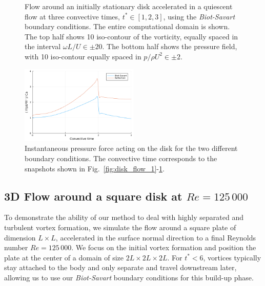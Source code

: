 \documentclass{article}
\begin{document}
\begin{figure}
\begin{subfigure}{.33\textwidth}
    \end{subfigure}
    \caption{Flow around an initially stationary disk accelerated in a quiescent flow at three convective times, $t^*\in [1,2,3]$, using the \emph{Biot-Savart} boundary conditions. The entire computational domain is shown. The top half shows 10 iso-contour of the vorticity, equally spaced in the interval $\omega L/U\in\pm20$. The bottom half shows the pressure field, with 10 iso-contour equally spaced in $p/\rho U^2\in\pm2$.}
    \label{fig:disk_flow_2}
\end{figure}


\begin{figure}
    \centering
    \includegraphics[width=0.5\textwidth]{tex//fig/Disk_256D_force.png}
    \caption{Instantaneous pressure force acting on the disk for the two different boundary conditions. The convective time corresponds to the snapshots shown in Fig.~\ref{fig:disk_flow_1}-\ref{fig:disk_flow_2}.}
    \label{fig:disk_forces}
\end{figure}


\subsection{3D Flow around a square disk at $Re=125\,000$}

To demonstrate the ability of our method to deal with highly separated and turbulent vortex formation, we simulate the flow around a square plate of dimension $L\times L$, accelerated in the surface normal direction to a final Reynolds number $Re=125\,000$. We focus on the initial vortex formation and position the plate at the center of a domain of size $2L\times2L\times2L$. For $t^*<6$, vortices typically stay attached to the body and only separate and travel downstream later, allowing us to use our \emph{Biot-Savart} boundary conditions for this build-up phase. 
\end{document}
